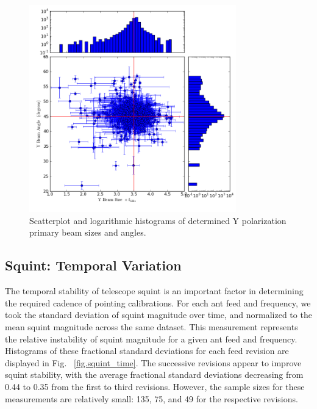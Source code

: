 \documentclass[preprint]{aastex}
\begin{document}
\begin{figure}[htb]
\begin{center}
\includegraphics[width=0.8\textwidth]{images/y_magangle}
\caption{Scatterplot and logarithmic histograms of determined Y polarization primary beam sizes and angles. \label{fig.y_shape}}
\end{center}
\end{figure}

\subsection{Squint: Temporal Variation}\label{ss.temporal}
The temporal stability of telescope squint is an important factor in 
determining the required cadence of pointing calibrations.  For each ant 
feed and frequency, we took the standard deviation of squint magnitude 
over time, and normalized to the mean squint magnitude across the same 
dataset.  This measurement represents the relative instability of squint 
magnitude for a given ant feed and frequency.  Histograms of these 
fractional standard deviations for each feed revision are displayed in Fig.~
\ref{fig.squint_time}.  The successive revisions appear to improve squint 
stability, with the average fractional standard deviations decreasing from 
0.44 to 0.35 from the first to third revisions.  However, the sample sizes for 
these measurements are relatively small: 135, 75, and 49 for the respective 
revisions.  
\end{document}
